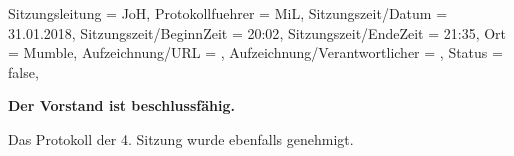 
\begin{Protokoll}{
        Sitzungsleitung                 = {JoH},             %
        Protokollfuehrer                = {MiL},              %
        Sitzungszeit/Datum              = {31.01.2018},       %
        Sitzungszeit/BeginnZeit         = {20:02},            %
        Sitzungszeit/EndeZeit           = {21:35},            %
        Ort                             = {Mumble},            %
        Aufzeichnung/URL                = {},                %
        Aufzeichnung/Verantwortlicher   = {},                  %
        Status                          = {false},            %
    }
    
    \begin{Anwesenheitsliste}
    \end{Anwesenheitsliste}
    
    \textbf{Der Vorstand ist beschlussfähig.}
    
    Das Protokoll der 4. Sitzung wurde ebenfalls genehmigt.
    

\end{Protokoll}
